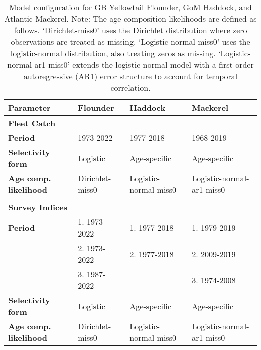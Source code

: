 \begin{table}[H]
\centering
\caption{Model configuration for GB Yellowtail Flounder, GoM Haddock, and Atlantic Mackerel. Note: The age composition likelihoods are defined as follows. `Dirichlet-miss0' uses the Dirichlet distribution where zero observations are treated as missing. `Logistic-normal-miss0' uses the logistic-normal distribution, also treating zeros as missing. `Logistic-normal-ar1-miss0' extends the logistic-normal model with a first-order autoregressive (AR1) error structure to account for temporal correlation.}
\label{model_config_table}
\begin{scriptsize} 
\begin{tabular}{p{4cm} p{3.5cm} p{3.5cm} p{3.5cm}} %
\toprule
\textbf{Parameter} & \textbf{Flounder} & \textbf{Haddock} & \textbf{Mackerel} \\
\midrule
\textbf{Fleet Catch} & & & \\
\textbf{Period} & 1973-2022 & 1977-2018 & 1968-2019 \\
\textbf{Selectivity form} & Logistic & Age-specific & Age-specific \\
\textbf{Age comp. likelihood} & Dirichlet-miss0 & Logistic-normal-miss0 & Logistic-normal-ar1-miss0 \\
 & & & \\
\textbf{Survey Indices} & & & \\
\textbf{Period} & 1. 1973-2022 & 1. 1977-2018 & 1. 1979-2019 \\
 & 2. 1973-2022 & 2. 1977-2018 & 2. 2009-2019 \\
 & 3. 1987-2022 & & 3. 1974-2008 \\
\textbf{Selectivity form} & Logistic & Age-specific & Age-specific \\
\textbf{Age comp. likelihood} & Dirichlet-miss0 & Logistic-normal-miss0 & Logistic-normal-ar1-miss0 \\
\bottomrule
\end{tabular}
\end{scriptsize}
\end{table}
